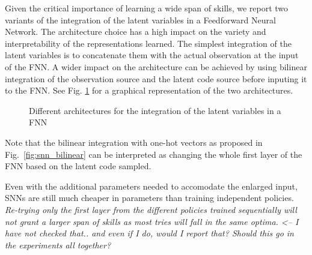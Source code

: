 \documentclass{article} %
\begin{document}
Given the critical importance of learning a wide span of skills, we report two variants of the integration of the latent variables in a Feedforward Neural Network. The architecture choice has a high impact on the variety and interpretability of the representations learned. The simplest integration of the latent variables is to concatenate them with the actual observation at the input of the FNN. A wider impact on the architecture can be achieved by using bilinear integration of the observation source and the latent code source before inputing it to the FNN. See Fig. \ref{fig:snn_architecture} for a graphical representation of the two architectures. 
\begin{figure}
	\centering
	\caption{Different architectures for the integration of the latent variables in a FNN}
	\label{fig:snn_architecture}
\end{figure}

Note that the bilinear integration with one-hot vectors as proposed in Fig.\ \ref{fig:snn_bilinear} can be interpreted as changing the whole first layer of the FNN based on the latent code sampled. 

Even with the additional parameters needed to accomodate the enlarged input, SNNs are still much cheaper in parameters than training independent policies.\textit{ Re-trying only the first layer from the different policies trained sequentially will not grant a larger span of skills as most tries will fall in the same optima. <-- I have not checked that.. and even if I do, would I report that? Should this go in the experiments all together?}
\end{document}
